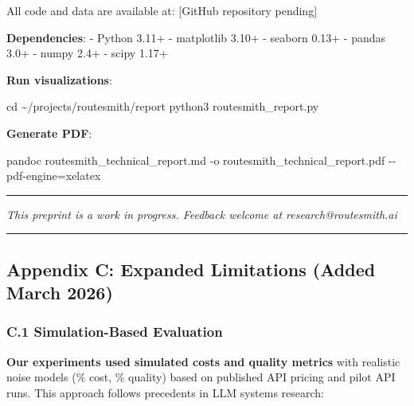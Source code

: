 \documentclass[
  11pt,
]{article}
\newenvironment{Shaded}{}{}
\newcommand{\AttributeTok}[1]{\textcolor[rgb]{0.49,0.56,0.16}{#1}}
\newcommand{\BuiltInTok}[1]{\textcolor[rgb]{0.00,0.50,0.00}{#1}}
\newcommand{\ExtensionTok}[1]{#1}
\newcommand{\NormalTok}[1]{#1}
\newcommand{\OperatorTok}[1]{\textcolor[rgb]{0.40,0.40,0.40}{#1}}
\begin{document}
All code and data are available at: {[}GitHub repository pending{]}

\textbf{Dependencies}: - Python 3.11+ - matplotlib 3.10+ - seaborn 0.13+
- pandas 3.0+ - numpy 2.4+ - scipy 1.17+

\textbf{Run visualizations}:

\begin{Shaded}
\begin{Highlighting}[]
\BuiltInTok{cd}\NormalTok{ \textasciitilde{}/projects/routesmith/report}
\ExtensionTok{python3}\NormalTok{ routesmith\_report.py}
\end{Highlighting}
\end{Shaded}

\textbf{Generate PDF}:

\begin{Shaded}
\begin{Highlighting}[]
\ExtensionTok{pandoc}\NormalTok{ routesmith\_technical\_report.md }\AttributeTok{{-}o}\NormalTok{ routesmith\_technical\_report.pdf }\AttributeTok{{-}{-}pdf{-}engine}\OperatorTok{=}\NormalTok{xelatex}
\end{Highlighting}
\end{Shaded}

\begin{center}\rule{0.5\linewidth}{0.5pt}\end{center}

\emph{This preprint is a work in progress. Feedback welcome at
research@routesmith.ai}

\begin{center}\rule{0.5\linewidth}{0.5pt}\end{center}

\hypertarget{appendix-c-expanded-limitations-added-march-2026}{%
\subsection{Appendix C: Expanded Limitations (Added March
2026)}\label{appendix-c-expanded-limitations-added-march-2026}}

\hypertarget{c.1-simulation-based-evaluation}{%
\subsubsection{C.1 Simulation-Based
Evaluation}\label{c.1-simulation-based-evaluation}}

\textbf{Our experiments used simulated costs and quality metrics} with
realistic noise models (\% cost, \% quality) based on published
API pricing and pilot API runs. This approach follows precedents in LLM
systems research:
\end{document}
